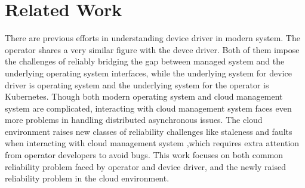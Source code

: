 \section{Related Work}
\label{sec:related_work}
There are previous efforts in understanding device driver in modern system\cite{Kadav:2012}.
The operator shares a very similar figure with the devce driver. 
Both of them impose the challenges of reliably bridging the gap between managed system and the underlying operating system interfaces,
    while the underlying system for device driver is operating system and the underlying system for the operator is Kubernetes.
Though both modern operating system and cloud management system are complicated, interacting with cloud management system 
    faces even more problems in handling distributed asynchronous issues.
The cloud environment raises new classes of reliability challenges like staleness and faults when interacting with cloud management system\cite{Sun:2022}
    ,which requires extra attention from operator developers to avoid bugs.
This work focuses on both common reliability problem faced by operator and device driver, 
    and the newly raised reliability problem in the cloud environment. 